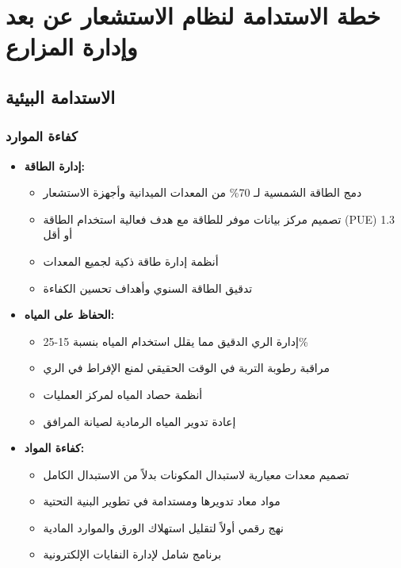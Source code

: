 \section{خطة الاستدامة لنظام الاستشعار عن بعد وإدارة المزارع}

\subsection{الاستدامة البيئية}

\subsubsection{كفاءة الموارد}
\begin{itemize}
    \item \textbf{إدارة الطاقة:}
    \begin{itemize}
        \item دمج الطاقة الشمسية لـ 70\% من المعدات الميدانية وأجهزة الاستشعار
        \item تصميم مركز بيانات موفر للطاقة مع هدف فعالية استخدام الطاقة (PUE) 1.3 أو أقل
        \item أنظمة إدارة طاقة ذكية لجميع المعدات
        \item تدقيق الطاقة السنوي وأهداف تحسين الكفاءة
    \end{itemize}
    
    \item \textbf{الحفاظ على المياه:}
    \begin{itemize}
        \item إدارة الري الدقيق مما يقلل استخدام المياه بنسبة 15-25\%
        \item مراقبة رطوبة التربة في الوقت الحقيقي لمنع الإفراط في الري
        \item أنظمة حصاد المياه لمركز العمليات
        \item إعادة تدوير المياه الرمادية لصيانة المرافق
    \end{itemize}
    
    \item \textbf{كفاءة المواد:}
    \begin{itemize}
        \item تصميم معدات معيارية لاستبدال المكونات بدلاً من الاستبدال الكامل
        \item مواد معاد تدويرها ومستدامة في تطوير البنية التحتية
        \item نهج رقمي أولاً لتقليل استهلاك الورق والموارد المادية
        \item برنامج شامل لإدارة النفايات الإلكترونية
    \end{itemize}
\end{itemize}

